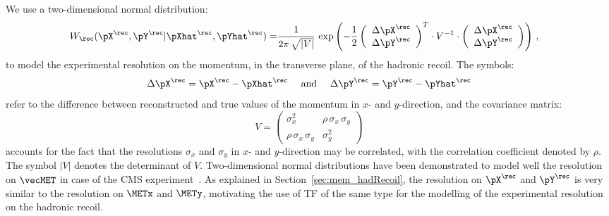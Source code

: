 We use a two-dimensional normal distribution:
\begin{align}
W_{\rec}( \pX^{\rec},\pY^{\rec} | \pXhat^{\rec},\pYhat^{\rec} ) = & 
  \frac{1}{2\pi \, \sqrt{\vert V \vert}} \, \exp \left( -\frac{1}{2}
  \left( \begin{array}{c} \Delta\pX^{\rec} \\ \Delta\pY^{\rec} \end{array} \right)^{T}
  \cdot V^{-1} \cdot
   \left( \begin{array}{c} \Delta\pX^{\rec} \\ \Delta\pY^{\rec} \end{array} \right)
  \right) \, ,
\label{eq:tf_hadRecoil}
\end{align}
to model the experimental resolution on the momentum, in the transverse plane, 
of the hadronic recoil.
The symbols:
\begin{equation}
\Delta\pX^{\rec} = \pX^{\rec} - \pXhat^{\rec} \quad \mbox{ and } \quad
\Delta\pY^{\rec} = \pY^{\rec} - \pYhat^{\rec} 
\label{eq:tf_hadRecoil_delta}
\end{equation}
refer to the difference between reconstructed and true values of the
momentum in $x$- and $y$-direction,
and the covariance matrix:
\begin{equation}
V = \left( \begin{array}{cc} \sigma_{x}^{2} & \rho \, \sigma_{x} \, \sigma_{y} \\ \rho \, \sigma_{x} \, \sigma_{y} & \sigma_{y}^{2} \end{array} \right) 
\label{eq:tf_hadRecoil_V}
\end{equation}
accounts for the fact that the resolutions $\sigma_{x}$ and $\sigma_{y}$ in $x$- and $y$-direction may be correlated,
with the correlation coefficient denoted by $\rho$.
The symbol $\vert V \vert$ denotes the determinant of $V$.
Two-dimensional normal distributions have been demonstrated to model well the resolution on $\vecMET$ in case of the CMS experiment~\cite{CMS-JME-13-003,CMS-JME-10-009}.
As explained in Section~\ref{sec:mem_hadRecoil}, the resolution on
$\pX^{\rec}$ and $\pY^{\rec}$ is very similar to the resolution on $\METx$ and $\METy$,
motivating the use of TF of the same type for the modelling of the experimental resolution on the hadronic recoil.

